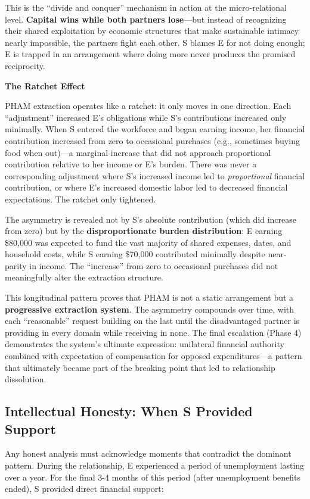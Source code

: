 \documentclass[12pt,openany]{book}
\numberwithin{equation}{chapter}
\begin{document}
This is the ``divide and conquer'' mechanism in action at the micro-relational level. \textbf{Capital wins while both partners lose}---but instead of recognizing their shared exploitation by economic structures that make sustainable intimacy nearly impossible, the partners fight each other. S blames E for not doing enough; E is trapped in an arrangement where doing more never produces the promised reciprocity.

\textbf{The Ratchet Effect}

PHAM extraction operates like a ratchet: it only moves in one direction. Each ``adjustment'' increased E's obligations while S's contributions increased only minimally. When S entered the workforce and began earning income, her financial contribution increased from zero to occasional purchases (e.g., sometimes buying food when out)---a marginal increase that did not approach proportional contribution relative to her income or E's burden. There was never a corresponding adjustment where S's increased income led to \textit{proportional} financial contribution, or where E's increased domestic labor led to decreased financial expectations. The ratchet only tightened.

The asymmetry is revealed not by S's absolute contribution (which did increase from zero) but by the \textbf{disproportionate burden distribution}: E earning \$80,000 was expected to fund the vast majority of shared expenses, dates, and household costs, while S earning \$70,000 contributed minimally despite near-parity in income. The ``increase'' from zero to occasional purchases did not meaningfully alter the extraction structure.

This longitudinal pattern proves that PHAM is not a static arrangement but a \textbf{progressive extraction system}. The asymmetry compounds over time, with each ``reasonable'' request building on the last until the disadvantaged partner is providing in every domain while receiving in none. The final escalation (Phase 4) demonstrates the system's ultimate expression: unilateral financial authority combined with expectation of compensation for opposed expenditures---a pattern that ultimately became part of the breaking point that led to relationship dissolution.

\subsection{Intellectual Honesty: When S Provided Support}

Any honest analysis must acknowledge moments that contradict the dominant pattern. During the relationship, E experienced a period of unemployment lasting over a year. For the final 3-4 months of this period (after unemployment benefits ended), S provided direct financial support:
\end{document}
